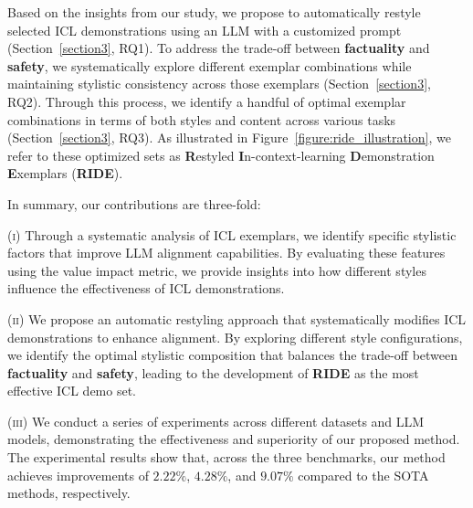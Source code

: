Based on the insights from our study, we propose to automatically restyle selected ICL demonstrations using an LLM with a customized prompt (Section~\ref{section3}, RQ1).
To address the trade-off between \textbf{\color{myblue} factuality} and \textbf{\color{myred} safety}, we systematically explore different exemplar combinations while maintaining stylistic consistency across those exemplars (Section~\ref{section3}, RQ2). Through this process, we identify a handful of optimal exemplar combinations in terms of both styles and content across various tasks (Section~\ref{section3}, RQ3). 
As illustrated in Figure~\ref{figure:ride_illustration}, we refer to these optimized sets as \textbf{R}estyled \textbf{I}n-context-learning \textbf{D}emonstration \textbf{E}xemplars (\textbf{RIDE}).


In summary, our contributions are three-fold:

\textsc{(i)} Through a systematic analysis of ICL exemplars, we identify specific stylistic factors that improve LLM alignment capabilities. By evaluating these features using the value impact metric, we provide insights into how different styles influence the effectiveness of ICL demonstrations.

\textsc{(ii)} We propose an automatic restyling approach that systematically modifies ICL demonstrations to enhance alignment. By exploring different style configurations, we identify the optimal stylistic composition that balances the trade-off between  \textbf{\color{myblue} factuality} and \textbf{\color{myred} safety}, leading to the development of \textbf{RIDE} as the most effective ICL demo set.

\textsc{(iii)} We conduct a series of experiments across different datasets and LLM models, demonstrating the effectiveness and superiority of our proposed method. The experimental results show that, across the three benchmarks, our method achieves improvements of $2.22\%$, $4.28\%$, and $9.07\%$ compared to the SOTA methods, respectively.